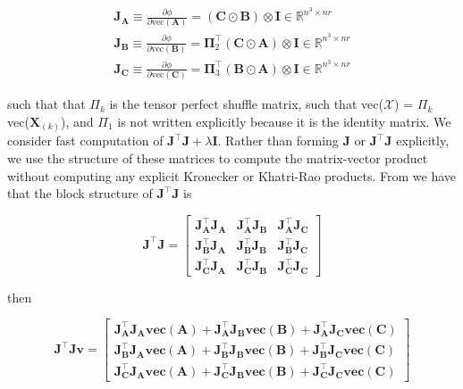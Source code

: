     \begin{equation}
        \begin{array}{rcl}
            \mathbf{J}_\mathbf{A} \equiv \frac{\partial \phi}{\partial \text{vec}(\mathbf{A})} = (\mathbf{C} \odot \mathbf{B}) \otimes \mathbf{I} \in \mathbb{R}^{n^3\times nr} \\
            \mathbf{J}_\mathbf{B} \equiv \frac{\partial \phi}{\partial \text{vec}(\mathbf{B})} = \mathbf{\Pi}_2^\intercal (\mathbf{C} \odot \mathbf{A}) \otimes \mathbf{I} \in \mathbb{R}^{n^3\times nr} \\
            \mathbf{J}_\mathbf{C} \equiv \frac{\partial \phi}{\partial \text{vec}(\mathbf{C})} = \mathbf{\Pi}_3^\intercal(\mathbf{B} \odot \mathbf{A}) \otimes \mathbf{I} \in \mathbb{R}^{n^3\times nr}
        \end{array}
        \label{eq:cp_dgn_jacobians}
    \end{equation}

    such that that $\Pi_k$ is the tensor perfect shuffle matrix, such that
    vec($\mathcal{X}$) = $\Pi_k$ vec($\mathbf{X}_{(k)}$), and $\Pi_1$ is not
    written explicitly because it is the identity matrix. We consider fast
    computation of $\mathbf{J^\intercal J} + \lambda \mathbf{I}$. Rather than
    forming $\mathbf{J}$ or $\mathbf{J^\intercal J}$ explicitly, we use the
    structure of these matrices to compute the matrix-vector product without
    computing any explicit Kronecker or Khatri-Rao products. From
     we have that the block structure of
    $\mathbf{J^\intercal J}$ is 

    \begin{equation*}
        \mathbf{J^\intercal J} = 
        \left[
        \begin{array}{ccc}
            \mathbf{J_A^\intercal J_A} & \mathbf{J_A^\intercal J_B} & \mathbf{J_A^\intercal J_C} \\ 
            \mathbf{J_B^\intercal J_A} & \mathbf{J_B^\intercal J_B} & \mathbf{J_B^\intercal J_C} \\ 
            \mathbf{J_C^\intercal J_A} & \mathbf{J_C^\intercal J_B} & \mathbf{J_C^\intercal J_C} 
        \end{array}
        \right]
    \end{equation*}
    
    then
    
    \begin{equation*}
        \mathbf{J^\intercal Jv} = 
        \left[
        \begin{array}{c}
            \mathbf{J_A^\intercal J_A\text{vec}(A)} + \mathbf{J_A^\intercal J_B\text{vec}(B)} + \mathbf{J_A^\intercal J_C\text{vec}(C)} \\ 
            \mathbf{J_B^\intercal J_A\text{vec}(A)} + \mathbf{J_B^\intercal J_B\text{vec}(B)} + \mathbf{J_B^\intercal J_C\text{vec}(C)} \\ 
            \mathbf{J_C^\intercal J_A\text{vec}(A)} + \mathbf{J_C^\intercal J_B\text{vec}(B)} + \mathbf{J_C^\intercal J_C\text{vec}(C)} 
        \end{array}
        \right]
    \end{equation*}
    
